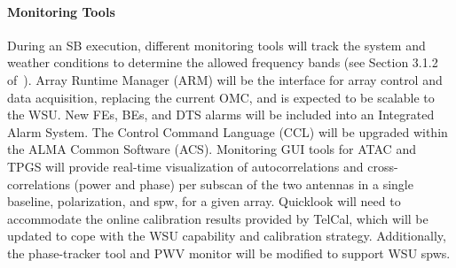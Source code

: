 \paragraph{Monitoring Tools}
\label{sec:MonitoringTools}
During an SB execution, different monitoring tools will track the system and weather conditions to determine the allowed frequency bands (see Section 3.1.2 of~\cite{CSA-IA}). Array Runtime Manager (ARM) will be the interface for array control and data acquisition, replacing the current OMC, and is expected to be scalable to the WSU. New FEs, BEs, and DTS alarms will be included into an Integrated Alarm System. The Control Command Language (CCL) will be upgraded within the ALMA Common Software (ACS).
Monitoring GUI tools for ATAC and TPGS will provide real-time visualization of autocorrelations and cross-correlations (power and phase) per subscan of the two antennas in a single baseline, polarization, and spw, for a given array. Quicklook will need to accommodate the online calibration results provided by TelCal, which will be updated to cope with the WSU capability and calibration strategy. Additionally, the phase-tracker tool and PWV monitor will be modified to support WSU spws.
